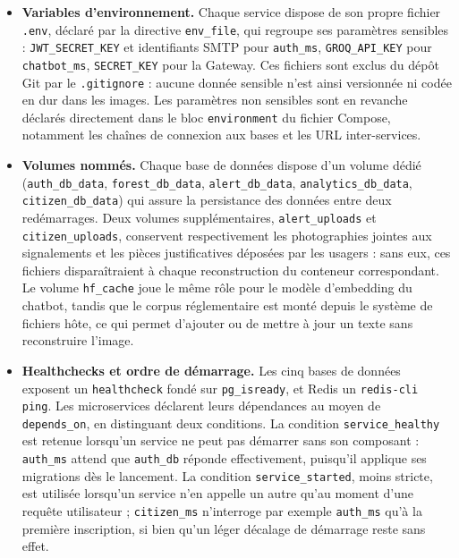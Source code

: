 \begin{itemize}
  \item \textbf{Variables d'environnement.} Chaque service dispose de son
        propre fichier \texttt{.env}, déclaré par la directive
        \texttt{env\_file}, qui regroupe ses paramètres sensibles :
        \texttt{JWT\_SECRET\_KEY} et identifiants SMTP pour
        \texttt{auth\_ms}, \texttt{GROQ\_API\_KEY} pour \texttt{chatbot\_ms},
        \texttt{SECRET\_KEY} pour la Gateway. Ces fichiers sont exclus du
        dépôt Git par le \texttt{.gitignore} : aucune donnée sensible n'est
        ainsi versionnée ni codée en dur dans les images. Les paramètres non
        sensibles sont en revanche déclarés directement dans le bloc
        \texttt{environment} du fichier Compose, notamment les chaînes de
        connexion aux bases et les URL inter-services.

  \item \textbf{Volumes nommés.} Chaque base de données dispose d'un volume
        dédié (\texttt{auth\_db\_data}, \texttt{forest\_db\_data},
        \texttt{alert\_db\_data}, \texttt{analytics\_db\_data},
        \texttt{citizen\_db\_data}) qui assure la persistance des données
        entre deux redémarrages. Deux volumes supplémentaires,
        \texttt{alert\_uploads} et \texttt{citizen\_uploads}, conservent
        respectivement les photographies jointes aux signalements et les
        pièces justificatives déposées par les usagers : sans eux, ces
        fichiers disparaîtraient à chaque reconstruction du conteneur
        correspondant. Le volume \texttt{hf\_cache} joue le même rôle pour le
        modèle d'embedding du chatbot, tandis que le corpus réglementaire est
        monté depuis le système de fichiers hôte, ce qui permet d'ajouter ou
        de mettre à jour un texte sans reconstruire l'image.

  \item \textbf{Healthchecks et ordre de démarrage.} Les cinq bases de
        données exposent un \texttt{healthcheck} fondé sur
        \texttt{pg\_isready}, et Redis un \texttt{redis-cli ping}. Les
        microservices déclarent leurs dépendances au moyen de
        \texttt{depends\_on}, en distinguant deux conditions. La condition
        \texttt{service\_healthy} est retenue lorsqu'un service ne peut pas
        démarrer sans son composant : \texttt{auth\_ms} attend que
        \texttt{auth\_db} réponde effectivement, puisqu'il applique ses
        migrations dès le lancement. La condition \texttt{service\_started},
        moins stricte, est utilisée lorsqu'un service n'en appelle un autre
        qu'au moment d'une requête utilisateur ; \texttt{citizen\_ms}
        n'interroge par exemple \texttt{auth\_ms} qu'à la première
        inscription, si bien qu'un léger décalage de démarrage reste sans
        effet.


\end{itemize}
